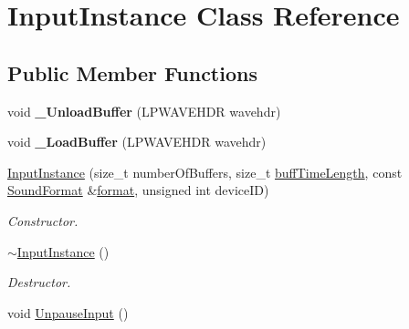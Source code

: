 \hypertarget{class_input_instance}{
\section{InputInstance Class Reference}
\label{class_input_instance}
}
\subsection*{Public Member Functions}
\begin{DoxyCompactItemize}
\item 
\hypertarget{class_input_instance_ae912ed8fb6b82f3ccc21565b03a2a8d0}{
void {\bfseries \_\-UnloadBuffer} (LPWAVEHDR wavehdr)}
\label{class_input_instance_ae912ed8fb6b82f3ccc21565b03a2a8d0}

\item 
\hypertarget{class_input_instance_a50a27506fb572027769ed3989a67654e}{
void {\bfseries \_\-LoadBuffer} (LPWAVEHDR wavehdr)}
\label{class_input_instance_a50a27506fb572027769ed3989a67654e}

\item 
\hyperlink{class_input_instance_aeae07f31f1462b76bc3ee9b3d8c335a5}{InputInstance} (size\_\-t numberOfBuffers, size\_\-t \hyperlink{class_input_instance_afb8d43905f59773f07a8d07f3f70069f}{buffTimeLength}, const \hyperlink{class_sound_format}{SoundFormat} \&\hyperlink{class_input_instance_ac59241416a2e8e57c2d29e450ec071b8}{format}, unsigned int deviceID)
\begin{DoxyCompactList}\small\item\em Constructor. \item\end{DoxyCompactList}\item 
\hypertarget{class_input_instance_a3834195c9489efd295b5664619733fb5}{
\hyperlink{class_input_instance_a3834195c9489efd295b5664619733fb5}{$\sim$InputInstance} ()}
\label{class_input_instance_a3834195c9489efd295b5664619733fb5}

\begin{DoxyCompactList}\small\item\em Destructor. \item\end{DoxyCompactList}\item 
\hypertarget{class_input_instance_a04ed77f4f8efcc855e0892c043d3805d}{
void \hyperlink{class_input_instance_a04ed77f4f8efcc855e0892c043d3805d}{UnpauseInput} ()}
\label{class_input_instance_a04ed77f4f8efcc855e0892c043d3805d}


\end{DoxyCompactItemize}

